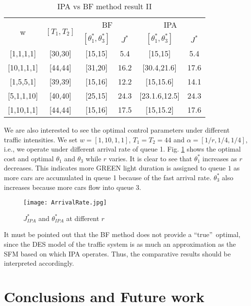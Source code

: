 \documentclass{ifacconf}\usepackage{graphicx}
\begin{document}
\begin{table}[tbh]
\caption{IPA vs BF method result II}\label{table2}
\begin{center}\begin{tabular}
[c]{|c|c|c|c||c|c|}\hline
\multirow{2}{*}{w} & \multirow{2}{*}{ $[T_1,T_2]$} & \multicolumn{2}{|c||}{BF}
& \multicolumn{2}{|c|}{IPA}\\\cline{3-6}
&  & $[\theta_{1}^{*},\theta_{3}^{*}]$ & $J^{*}$ & $[\theta_{1}^{*},\theta
_{3}^{*}]$ & $J^{*}$\\\hline
{[1,1,1,1]} & [30,30] & [15,15] & 5.4 & [15,15] & 5.4\\\hline
{[10,1,1,1]} & [44,44] & [31,20] & 16.2 & [30.4,21.6] & 17.6\\\hline
{[1,5,5,1]} & [39,39] & [15,16] & 12.2 & [15,15.6] & 14.1\\\hline
{[5,1,1,10]} & [40,40] & [25,15] & 24.3 & [23.1.6,12.5] & 24.3\\\hline
{[1,10,1,1]} & [44,44] & [15,16] & 17.5 & [15,15.2] & 17.6\\\hline
\end{tabular}
\end{center}
\end{table}

We are also interested to see the optimal control parameters under different traffic intensities. We set $w=[1,10,1,1]$, $T_1=T_2=44$ and $\alpha = [1/r,1/4,1/4]$, i.e., we operate under different arrival rate of queue 1. Fig. \ref{arrivalRate} shows the optimal cost and optimal $\theta_1$ and $\theta_3$ while $r$ varies. It is clear to see that $\theta_{1}^{*}$ increases as $r$ decreases. This indicates more GREEN light duration is assigned to queue $1$ as more cars are accumulated in queue 1 because of the fast arrival rate. $\theta_3^{*}$ also increases because more cars flow into queue 3. 

\begin{figure}[tbh]
\centering
\texttt{[image: ArrivalRate.jpg]}\caption{$J_{IPA}^{*}$ and $\theta_{IPA}^{*}$ at different $r$}\label{arrivalRate}\end{figure}

It must be pointed out that the BF method does not provide a \textquotedblleft true\textquotedblright\ optimal, since the DES model of the traffic system is as much an approximation as the SFM based on which IPA operates. Thus, the comparative results should be interpreted accordingly. 

\section{Conclusions and Future work}
\end{document}

